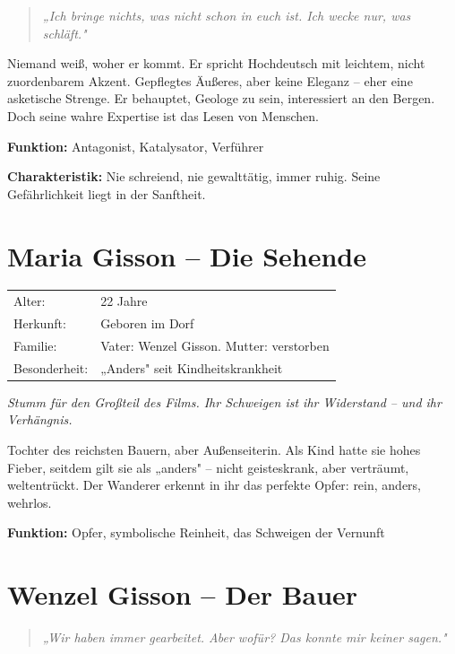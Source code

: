 \documentclass[11pt,a4paper,twoside]{book}
\begin{document}
\begin{quote}
\textit{„Ich bringe nichts, was nicht schon in euch ist. Ich wecke nur, was schläft."}
\end{quote}

Niemand weiß, woher er kommt. Er spricht Hochdeutsch mit leichtem, nicht zuordenbarem Akzent. Gepflegtes Äußeres, aber keine Eleganz -- eher eine asketische Strenge. Er behauptet, Geologe zu sein, interessiert an den Bergen. Doch seine wahre Expertise ist das Lesen von Menschen.

\textbf{Funktion:} Antagonist, Katalysator, Verführer

\textbf{Charakteristik:} Nie schreiend, nie gewalttätig, immer ruhig. Seine Gefährlichkeit liegt in der Sanftheit.

\section{Maria Gisson -- Die Sehende}

\begin{tcolorbox}[title=Basisdaten]
\begin{tabular}{ll}
Alter: & 22 Jahre \\
Herkunft: & Geboren im Dorf \\
Familie: & Vater: Wenzel Gisson. Mutter: verstorben \\
Besonderheit: & „Anders" seit Kindheitskrankheit
\end{tabular}
\end{tcolorbox}

\textit{Stumm für den Großteil des Films. Ihr Schweigen ist ihr Widerstand -- und ihr Verhängnis.}

Tochter des reichsten Bauern, aber Außenseiterin. Als Kind hatte sie hohes Fieber, seitdem gilt sie als „anders" -- nicht geisteskrank, aber verträumt, weltentrückt. Der Wanderer erkennt in ihr das perfekte Opfer: rein, anders, wehrlos.

\textbf{Funktion:} Opfer, symbolische Reinheit, das Schweigen der Vernunft

\section{Wenzel Gisson -- Der Bauer}

\begin{quote}
\textit{„Wir haben immer gearbeitet. Aber wofür? Das konnte mir keiner sagen."}
\end{quote}
\end{document}
